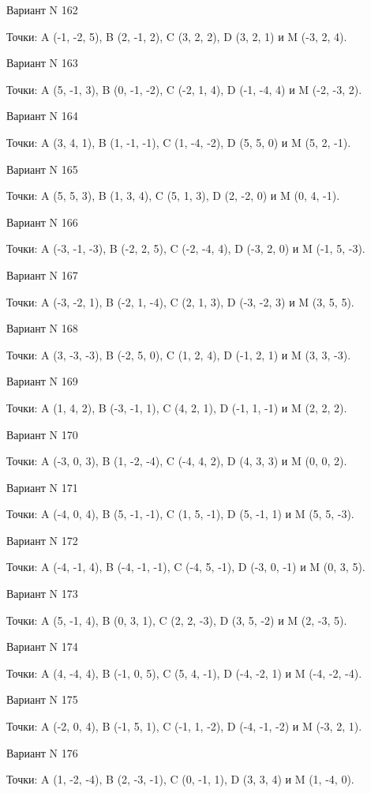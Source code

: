 \documentclass[11pt]{report}
\begin{document}
Вариант N 162

Точки: A (-1, -2, 5), B (2, -1, 2), C (3, 2, 2), D (3, 2, 1) и M (-3, 2, 4).

Вариант N 163

Точки: A (5, -1, 3), B (0, -1, -2), C (-2, 1, 4), D (-1, -4, 4) и M (-2, -3, 2).

Вариант N 164

Точки: A (3, 4, 1), B (1, -1, -1), C (1, -4, -2), D (5, 5, 0) и M (5, 2, -1).

Вариант N 165

Точки: A (5, 5, 3), B (1, 3, 4), C (5, 1, 3), D (2, -2, 0) и M (0, 4, -1).

Вариант N 166

Точки: A (-3, -1, -3), B (-2, 2, 5), C (-2, -4, 4), D (-3, 2, 0) и M (-1, 5, -3).

Вариант N 167

Точки: A (-3, -2, 1), B (-2, 1, -4), C (2, 1, 3), D (-3, -2, 3) и M (3, 5, 5).

Вариант N 168

Точки: A (3, -3, -3), B (-2, 5, 0), C (1, 2, 4), D (-1, 2, 1) и M (3, 3, -3).

Вариант N 169

Точки: A (1, 4, 2), B (-3, -1, 1), C (4, 2, 1), D (-1, 1, -1) и M (2, 2, 2).

Вариант N 170

Точки: A (-3, 0, 3), B (1, -2, -4), C (-4, 4, 2), D (4, 3, 3) и M (0, 0, 2).

Вариант N 171

Точки: A (-4, 0, 4), B (5, -1, -1), C (1, 5, -1), D (5, -1, 1) и M (5, 5, -3).

Вариант N 172

Точки: A (-4, -1, 4), B (-4, -1, -1), C (-4, 5, -1), D (-3, 0, -1) и M (0, 3, 5).

Вариант N 173

Точки: A (5, -1, 4), B (0, 3, 1), C (2, 2, -3), D (3, 5, -2) и M (2, -3, 5).

Вариант N 174

Точки: A (4, -4, 4), B (-1, 0, 5), C (5, 4, -1), D (-4, -2, 1) и M (-4, -2, -4).

Вариант N 175

Точки: A (-2, 0, 4), B (-1, 5, 1), C (-1, 1, -2), D (-4, -1, -2) и M (-3, 2, 1).

Вариант N 176

Точки: A (1, -2, -4), B (2, -3, -1), C (0, -1, 1), D (3, 3, 4) и M (1, -4, 0).
\end{document}
